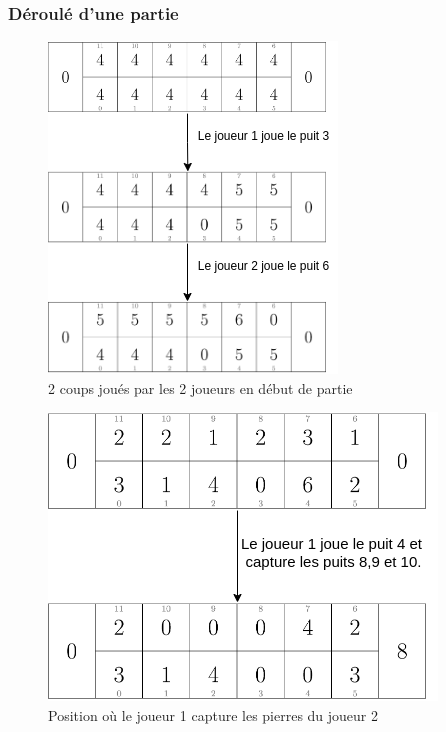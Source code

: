 \message{ !name(test.tex)}\documentclass{beamer}
\begin{document}
\begin{frame}
  \frametitle{Déroulé d'une partie}
  \begin{minipage}[b]{0.45\linewidth}
    \begin{figure}
      \centering
      \includegraphics[width=1\linewidth]{ressources/diagramme1.png}
      \caption{2 coups joués par les 2 joueurs en début de partie}
    \end{figure}
  \end{minipage}
  \hfill
  \begin{minipage}[b]{0.45\linewidth}    
    \begin{figure}
      \centering
      \includegraphics[width=1\linewidth]{ressources/diagramme2.png}
      \caption{Position où le joueur 1 capture les pierres du joueur 2}
    \end{figure}
  \end{minipage}
\end{frame}
\end{document}
